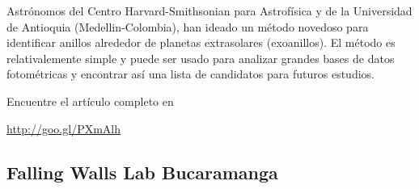 \documentclass{book}
\begin{document}
Astrónomos del Centro Harvard-Smithsonian para Astrofísica y de la Universidad de Antioquia (Medellin-Colombia), han ideado un método novedoso para identificar anillos alrededor de planetas extrasolares (exoanillos).  El método es relativalemente simple y puede ser usado para analizar grandes bases de datos fotométricas y encontrar así una lista de candidatos para futuros estudios.

Encuentre el artículo completo en

\begin{center}
\url{http://goo.gl/PXmAlh}
\end{center}

\subsection{Falling Walls Lab Bucaramanga}
\end{document}
